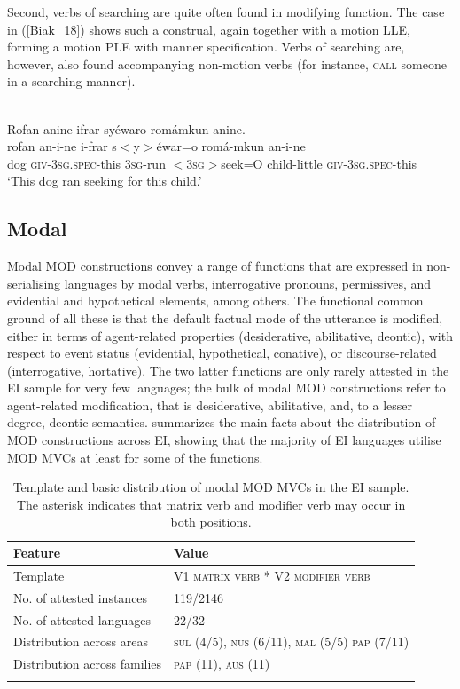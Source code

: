 Second, verbs of searching are quite often found in modifying function. The  case in (\ref{Biak_18}) shows such a construal, again together with a motion LLE, forming a motion PLE with manner specification. Verbs of searching are, however, also found accompanying non-motion verbs (for instance, \textsc{call} someone in a searching manner).

\ea \label{Biak_18}
\\
\glll Rofan anine ifrar syéwaro romámkun anine. \\
rofan an-i-ne i-frar s$<$y$>$éwar=o romá-mkun an-i-ne \\
dog \textsc{giv}-3\textsc{sg}.\textsc{spec}-this 3\textsc{sg}-run $<$3\textsc{sg}$>$seek=O child-little \textsc{giv}-3\textsc{sg}.\textsc{spec}-this \\
\glft `This dog ran seeking for this child.'\\ 
\z

\subsection{Modal}\label{sec:modal}

Modal MOD constructions convey a range of functions that are expressed in non-serialising languages by modal verbs, interrogative pronouns, permissives, and evidential and hypothetical elements, among others. The functional common ground of all these is that the default factual mode of the utterance is modified, either in terms of agent-related properties (desiderative, abilitative, deontic), with respect to event status (evidential, hypothetical, conative), or discourse-related (interrogative, hortative). The two latter functions are only rarely attested in the EI sample for very few languages; the bulk of modal MOD constructions refer to agent-related modification, that is desiderative, abilitative, and, to a lesser degree, deontic semantics.  summarizes the main facts about the distribution of MOD constructions across EI, showing that the majority of EI languages utilise MOD MVCs at least for some of the functions.

\begin{table}
\begin{tabular}{ll}
\lsptoprule
Feature&Value\tabularnewline
\midrule
Template&V1 \textsc{matrix verb} * V2 \textsc{modifier verb}\tabularnewline
No. of attested instances& 119/2146 \tabularnewline
No. of attested languages& 22/32 \tabularnewline
Distribution across areas& \textsc{sul} (4/5), \textsc{nus} (6/11), \textsc{mal} (5/5) \textsc{pap} (7/11) \tabularnewline
Distribution across families& \textsc{pap} (11), \textsc{aus} (11) \tabularnewline
\lspbottomrule
\end{tabular}
\caption[Template and basic distribution of modal MOD MVCs]{Template and basic distribution of modal MOD MVCs in the EI sample. The asterisk indicates that matrix verb and modifier verb may occur in both positions.}
\label{table:modal}
\end{table}


